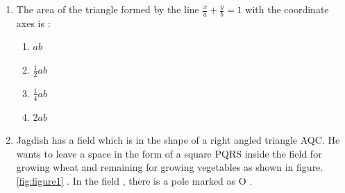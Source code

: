 %
\begin{enumerate}
        \item The area of the triangle formed by the line $ \frac{x}{a} + \frac{y}{b} = 1 $ with the coordinate axes is :
        \begin{enumerate}
             \item  $ ab $
             \item  $\frac{1}{2}ab$
             \item  $\frac{1}{4}ab$
             \item  $2ab$
        \end{enumerate}
	\item Jagdish has a field which is in the shape of a right angled triangle AQC. He wants to leave a space in the form of a square PQRS inside the field for growing wheat and remaining for growing vegetables as shown in figure. \ref{fig:figure1} . In the field , there is a pole marked as O .


\end{enumerate}

